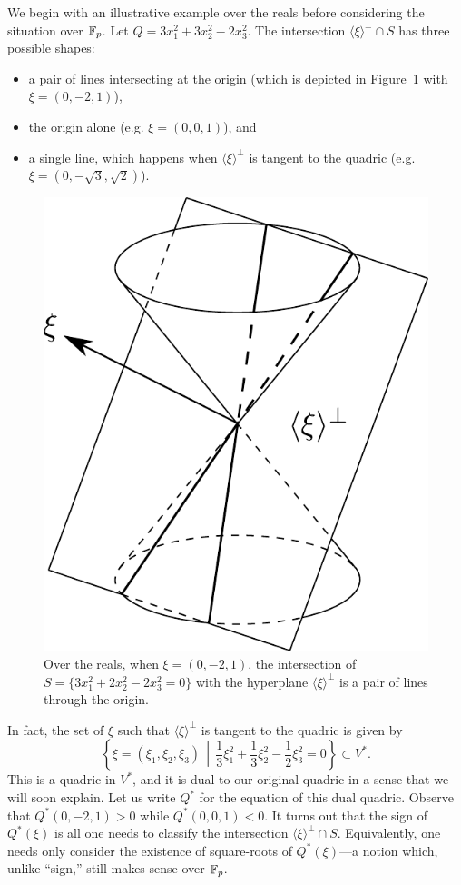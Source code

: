 We begin with an illustrative example over the reals before considering the situation over $\mathbb{F}_p$. Let $Q = 3x_1^2 + 3x_2^2 - 2x_3^2$.
The intersection $\langle \xi \rangle^\bot \cap S$ has three possible shapes:
\begin{itemize}
	\item a pair of lines intersecting at the origin (which is depicted in Figure~\ref{fig:conic-with-plane} with $\xi = (0,-2,1)$),
	\item the origin alone (e.g. $\xi = (0,0,1)$), and
	\item a single line, which happens when $\langle \xi \rangle^\bot$ is tangent to the quadric (e.g. $\xi = (0,-\sqrt{3},\sqrt{2})$).
\end{itemize}
\begin{figure}[h]
	\centering
	\includegraphics[width=0.6\linewidth]{conic-with-plane}
	\caption{Over the reals, when $\xi=(0,-2,1)$, the intersection of $S = \{3x_1^2 + 2x_2^2 - 2x_3^2 = 0\}$ with the hyperplane $\langle \xi \rangle^\bot$ is a pair of lines through the origin.}
	\label{fig:conic-with-plane}
\end{figure}
In fact, the set of $\xi$ such that $\langle \xi \rangle^\bot$ is tangent to the quadric is given by
\[
	\left\{ \xi = (\xi_1,\xi_2,\xi_3) \,\middle|\, \frac{1}{3} \xi_1^2 + \frac{1}{3} \xi_2^2 - \frac{1}{2} \xi_3^2 = 0 \right\} \subset V^*.
\]
This is a quadric in $V^*$, and it is dual to our original quadric in a sense that we will soon explain. Let us write $Q^*$ for the equation of this dual quadric. Observe that $Q^*(0,-2,1) > 0$ while $Q^*(0,0,1) < 0$. It turns out that the sign of $Q^*(\xi)$ is all one needs to classify the intersection $\langle \xi \rangle^\bot \cap S$. Equivalently, one needs only consider the existence of square-roots of $Q^*(\xi)$---a notion which, unlike ``sign,'' still makes sense over $\mathbb{F}_p$.

